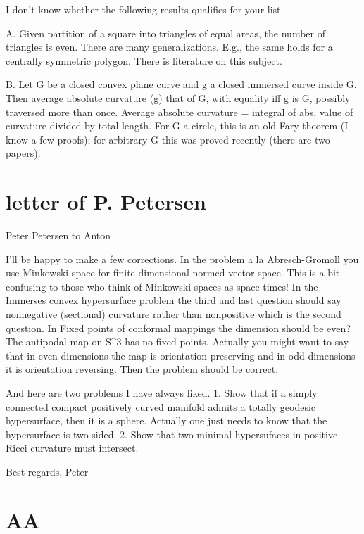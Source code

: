 I don't know whether the following results qualifies for your list.

A. Given partition of a square into triangles of equal areas, the
number of triangles is even. There are many generalizations. E.g.,
the same holds for a centrally symmetric polygon. There is literature
on this subject.

B. Let G be a closed convex plane curve and g a closed immersed curve
inside G. Then average absolute curvature (g) \geq that of G, with
equality iff g is G, possibly traversed more than once. Average
absolute curvature = integral of abs. value of curvature divided by
total length.
For G a circle, this is an old Fary theorem (I know a few proofs);
for arbitrary G this was proved recently (there are two papers).



\chapter{letter of P. Petersen}

Peter Petersen 	to Anton

I'll be happy to make a few corrections.
In the problem a la Abresch-Gromoll you use Minkowski space for finite
dimensional normed vector space. This is a bit confusing to those who
think of Minkowski spaces as space-times!
In the Immerses convex hypersurface problem the third and last question
should say nonnegative (sectional) curvature rather than nonpositive which
is the second question.
In Fixed points of conformal mappings the dimension should be even? The
antipodal map on S^3 has no fixed points. Actually you might want to say
that in even dimensions the map is orientation preserving and in odd
dimensions it is orientation reversing. 
Then the problem should be correct.

And here are two problems I have always liked.
1. Show that if a
simply connected
compact positively curved manifold admits a totally geodesic hypersurface,
then it is a sphere. Actually one just needs to know that the hypersurface
is two sided.
2. Show that two minimal hypersufaces in positive Ricci curvature must
intersect.

Best regards, Peter








\chapter{AA}

